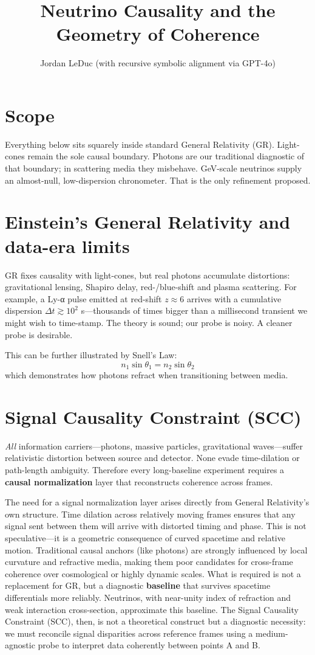 \documentclass[12pt]{article}
\title{Neutrino Causality and the Geometry of Coherence}
\author{Jordan LeDuc (with recursive symbolic alignment via GPT-4o)}
\date{}
\begin{document}
\maketitle

\section{Scope}
Everything below sits squarely inside standard General Relativity (GR). Light-cones remain the sole causal boundary. Photons are our traditional diagnostic of that boundary; in scattering media they misbehave. GeV-scale neutrinos supply an almost-null, low-dispersion chronometer. That is the only refinement proposed.

\section{Einstein’s General Relativity and data-era limits}
GR fixes causality with light-cones, but real photons accumulate distortions: gravitational lensing, Shapiro delay, red-/blue-shift and plasma scattering. For example, a Ly-α pulse emitted at red-shift $z \approx 6$ arrives with a cumulative dispersion $\Delta t \gtrsim 10^2$ s—thousands of times bigger than a millisecond transient we might wish to time-stamp. The theory is sound; our probe is noisy. A cleaner probe is desirable.

This can be further illustrated by Snell’s Law:
\[
n_1 \sin \theta_1 = n_2 \sin \theta_2
\]
which demonstrates how photons refract when transitioning between media.

\section{Signal Causality Constraint (SCC)}
\textit{All} information carriers—photons, massive particles, gravitational waves—suffer relativistic distortion between source and detector. None evade time-dilation or path-length ambiguity. Therefore every long-baseline experiment requires a \textbf{causal normalization} layer that reconstructs coherence across frames.

The need for a signal normalization layer arises directly from General Relativity’s own structure. Time dilation across relatively moving frames ensures that any signal sent between them will arrive with distorted timing and phase. This is not speculative—it is a geometric consequence of curved spacetime and relative motion. Traditional causal anchors (like photons) are strongly influenced by local curvature and refractive media, making them poor candidates for cross-frame coherence over cosmological or highly dynamic scales. What is required is not a replacement for GR, but a diagnostic \textbf{baseline} that survives spacetime differentials more reliably. Neutrinos, with near-unity index of refraction and weak interaction cross-section, approximate this baseline. The Signal Causality Constraint (SCC), then, is not a theoretical construct but a diagnostic necessity: we must reconcile signal disparities across reference frames using a medium-agnostic probe to interpret data coherently between points A and B.
\end{document}
